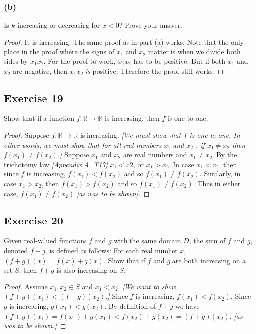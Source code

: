\documentclass[14pt]{extarticle}
\newcommand{\R}{\mathbb{R}}
\begin{document}
\subsubsection{(b)}
Is \(k\) increasing or decreasing for \(x < 0\)? Prove your answer.

\begin{proof}
    It is increasing. The same proof as in part (a) works. Note that the only place in the proof where the signs of \(x_1\)
    and \(x_2\) matter is when we divide both sides by \(x_1x_2\). For the proof to work, \(x_1x_2\) has to be positive. But if
    both \(x_1\) and \(x_2\) are negative, then \(x_1x_2\) {\it is} positive. Therefore the proof still works.
\end{proof}

\subsection{Exercise 19}
Show that if a function \(f: \R \to \R\) is increasing, then \(f\) is one-to-one.

\begin{proof}
    Suppose \(f: \R \to \R\) is increasing. {\it [We must show that \(f\) is one-to-one. In other words, we must show that
                for all real numbers \(x_1\) and \(x_2\) , if \(x_1 \neq x_2\) then \(f(x_1) \neq f(x_2)\).]} Suppose \(x_1\) and \(x_2\) are
    real numbers and \(x_1 \neq x_2\). By the trichotomy law {\it [Appendix A, T17]} \(x_1 < x2\), or \(x_1 > x_2\). In case
    \(x_1 < x_2\), then since \(f\) is increasing, \(f(x_1) < f(x_2)\) and so \(f(x_1) \neq f(x_2)\). Similarly, in case
    \(x_1 > x_2\), then \(f(x_1) > f(x_2)\) and so \(f(x_1)\neq f(x_2)\). Thus in either case, \(f(x_1) \neq f(x_2)\)
    {\it [as was to be shown].}
\end{proof}

\subsection{Exercise 20}
Given real-valued functions \(f\) and \(g\) with the same domain \(D\), the sum of \(f\) and \(g\), denoted \(f + g\),
is defined as follows: For each real number \(x\), \((f + g)(x) = f(x) + g(x)\). Show that if \(f\) and \(g\) are both
increasing on a set \(S\), then \(f + g\) is also increasing on \(S\).

\begin{proof}
    Assume \(x_1, x_2 \in S\) and \(x_1 < x_2\). {\it [We want to show \((f+g)(x_1) < (f+g)(x_2)\).]} Since \(f\) is increasing,
    \(f(x_1) < f(x_2)\). Since \(g\) is increasing, \(g(x_1) < g(x_2)\). By definition of \(f+g\) we have \((f+g)(x_1) =
    f(x_1) + g(x_1) < f(x_2) + g(x_2) = (f+g)(x_2)\), {\it [as was to be shown.]}
\end{proof}
\end{document}
